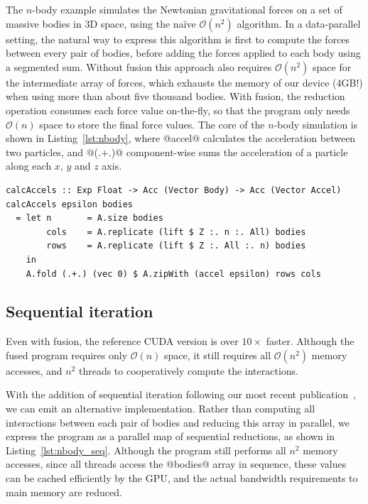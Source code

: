 The $n$-body example simulates the Newtonian gravitational forces on a set of
massive bodies in 3D space, using the na\"ive $\mathcal{O}\left( n^{2} \right)$
algorithm. In a data-parallel setting, the natural way to express this algorithm
is first to compute the forces between every pair of bodies, before adding the
forces applied to each body using a segmented sum. Without fusion this approach
also requires $\mathcal{O}\left( n^{2} \right)$ space for the intermediate array
of forces, which exhausts the memory of our device (4GB!) when using more than
about five thousand bodies. With fusion, the reduction operation consumes each
force value on-the-fly, so that the program only needs $\mathcal{O}\left( n
\right)$ space to store the final force values. The core of the $n$-body
simulation is shown in Listing~\ref{lst:nbody}, where @accel@ calculates
the acceleration between two particles, and @(.+.)@ component-wise sums the
acceleration of a particle along each $x$, $y$ and $z$ axis.

\begin{lstlisting}[style=haskell_float
    ,label=lst:nbody
    ,caption={$N$-body gravitational simulation, using parallel reduction}]
calcAccels :: Exp Float -> Acc (Vector Body) -> Acc (Vector Accel)
calcAccels epsilon bodies
  = let n       = A.size bodies
        cols    = A.replicate (lift $ Z :. n :. All) bodies
        rows    = A.replicate (lift $ Z :. All :. n) bodies
    in
    A.fold (.+.) (vec 0) $ A.zipWith (accel epsilon) rows cols
\end{lstlisting}


\subsection{Sequential iteration}

Even with fusion, the reference CUDA version is over $10\times$ faster. Although
the fused program requires only $\mathcal{O}\left( n \right)$ space, it still
requires all $\mathcal{O}\left( n^2 \right)$ memory accesses, and $n^{2}$
threads to cooperatively compute the interactions.

With the addition of sequential iteration following our most recent
publication~\cite{McDonell:2013wi}, we can emit an alternative implementation.
Rather than computing all interactions between each pair of bodies and reducing
this array in parallel, we express the program as a parallel map of sequential
reductions, as shown in Listing~\ref{lst:nbody_seq}. Although the program still
performs all $n^{2}$ memory accesses, since all threads access the @bodies@
array in sequence, these values can be cached efficiently by the GPU, and the
actual bandwidth requirements to main memory are reduced.


